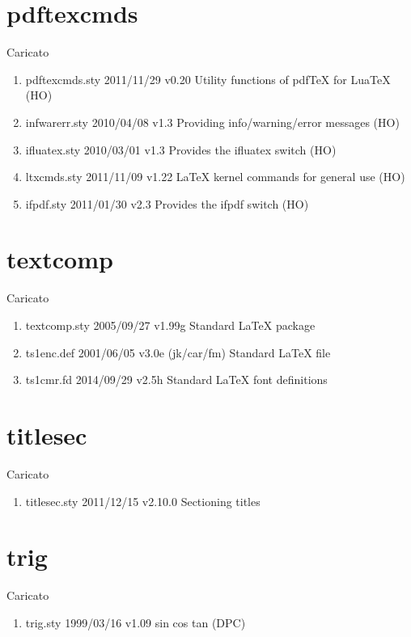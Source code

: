 \section{pdftexcmds}	 	 

Caricato 
\begin{enumerate}
\item pdftexcmds.sty 2011/11/29 v0.20 Utility functions of pdfTeX for LuaTeX (HO)
\item infwarerr.sty 2010/04/08 v1.3 Providing info/warning/error messages (HO)
\item ifluatex.sty 2010/03/01 v1.3 Provides the ifluatex switch (HO)
\item ltxcmds.sty 2011/11/09 v1.22 LaTeX kernel commands for general use (HO)
\item ifpdf.sty 2011/01/30 v2.3 Provides the ifpdf switch (HO)
\end{enumerate}		
\section{textcomp}	 	 

Caricato 
\begin{enumerate}
\item 	textcomp.sty 2005/09/27 v1.99g Standard LaTeX package
\item 	ts1enc.def 2001/06/05 v3.0e (jk/car/fm) Standard LaTeX file
\item 	ts1cmr.fd 2014/09/29 v2.5h Standard LaTeX font definitions
\end{enumerate}	 
\section{titlesec}	 	 

Caricato 
\begin{enumerate}
	\item titlesec.sty 2011/12/15 v2.10.0 Sectioning titles
\end{enumerate}	 
\section{trig}	 	 

Caricato 
\begin{enumerate}
\item trig.sty 1999/03/16 v1.09 sin cos tan (DPC)
\end{enumerate}	
